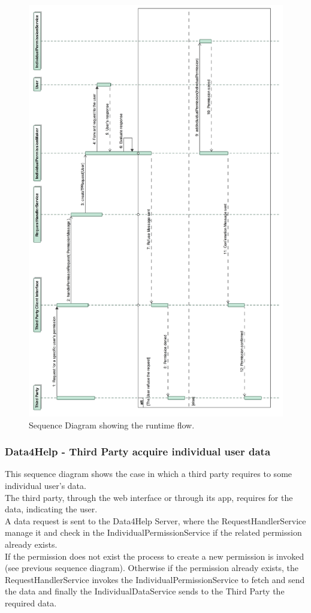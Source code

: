 \documentclass[a4paper]{article}
\begin{document}
\begin{figure}[H]
    \centering
    \includegraphics[width=\linewidth]{SequenceDiagram-RequestForUserIndividualPermission}
    \caption{Sequence Diagram showing the runtime flow.}
    \label{fig:my_label}
\end{figure}
\clearpage

\subsubsection{Data4Help - Third Party acquire individual user data}
This sequence diagram shows the case in which a third party requires to some individual user's data. \\
The third party, through the web interface or through its app, requires for the data, indicating the user. \\
A data request is sent to the Data4Help Server, where the RequestHandlerService manage it and check in the IndividualPermissionService if the related permission already exists. \\
If the permission does not exist the process to create a new permission is invoked (see previous sequence diagram). Otherwise if the permission already exists, the RequestHandlerService invokes the IndividualPermissionService to fetch and send the data and finally the IndividualDataService sends to the Third Party the required data.
\end{document}
